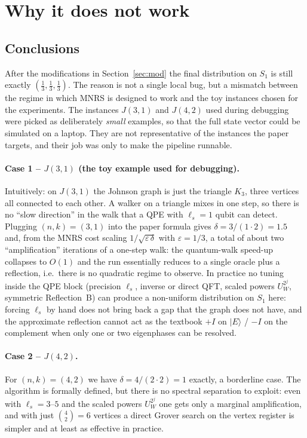 \documentclass[11pt,a4paper]{article}
\begin{document}
\section{Why it does not work}
\label{sec:diag}

\subsection{Conclusions}

After the modifications in Section~\ref{sec:mod} the final distribution
on $S_1$ is still exactly $(\tfrac13,\tfrac13,\tfrac13)$. The reason is
not a single local bug, but a mismatch between the regime in which
MNRS is designed to work and the toy instances chosen for the
experiments. The instances $J(3,1)$ and $J(4,2)$
used during debugging were picked as deliberately \emph{small} examples,
so that the full state vector could be simulated on a laptop. They are
not representative of the instances the paper targets, and their job
was only to make the pipeline runnable.

\paragraph{Case 1 -- $J(3,1)$ (the toy example used for debugging).}
Intuitively: on $J(3,1)$ the Johnson graph is just the triangle $K_3$,
three vertices all connected to each other. A walker on a triangle
mixes in one step, so there is no ``slow direction'' in the walk that
a QPE with $\ell_s=1$ qubit can detect. Plugging $(n,k)=(3,1)$ into
the paper formula gives $\delta=3/(1\cdot 2)=1.5$ and, from the MNRS
cost scaling $1/\sqrt{\varepsilon\,\delta}$ with $\varepsilon=1/3$,
a total of about two ``amplification'' iterations of a one-step walk:
the quantum-walk speed-up collapses to $O(1)$ and the run essentially
reduces to a single oracle plus a reflection, i.e.\ there is no
quadratic regime to observe. In practice no tuning inside the QPE
block (precision $\ell_s$, inverse or direct QFT, scaled powers
$U_W^{2^j}$, symmetric Reflection~B) can produce a non-uniform
distribution on $S_1$ here: forcing $\ell_s$ by hand does not bring
back a gap that the graph does not have, and the approximate
reflection cannot act as the textbook $+I$ on $|E\rangle$ / $-I$ on
the complement when only one or two eigenphases can be resolved.

\paragraph{Case 2 -- $J(4,2)$.}
For $(n,k)=(4,2)$ we have $\delta = 4/(2\cdot 2) = 1$ exactly, a
borderline case. The algorithm is formally defined, but there is no
spectral separation to exploit: even with $\ell_s=3$--$5$ and the
scaled powers $U_W^{2^j}$ one gets only a marginal amplification, and
with just $\binom{4}{2}=6$ vertices a direct Grover search on the
vertex register is simpler and at least as effective in practice.
\end{document}
